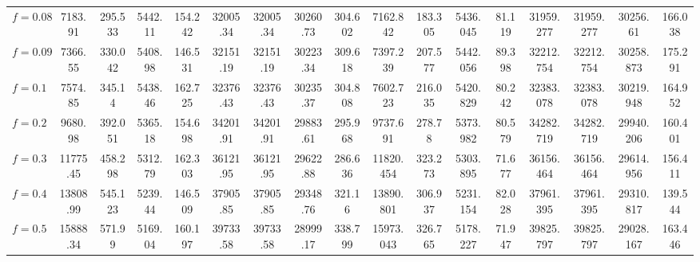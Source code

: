 \begin{tabular}{@{}lcccccccccccccccc@{}}
$f = 0.08$ & 7183.91 & 295.533 & 5442.11 & 154.242 & 32005.34 & 32005.34 & 30260.73 & 304.602 & 7162.842 & 183.305 & 5436.045 & 81.119 & 31959.277 & 31959.277 & 30256.61 & 166.038 \\
$f = 0.09$ & 7366.55 & 330.042 & 5408.98 & 146.531 & 32151.19 & 32151.19 & 30223.34 & 309.618 & 7397.239 & 207.577 & 5442.056 & 89.398 & 32212.754 & 32212.754 & 30258.873 & 175.291 \\
$f = 0.1$ & 7574.85 & 345.14 & 5438.46 & 162.725 & 32376.43 & 32376.43 & 30235.37 & 304.808 & 7602.723 & 216.035 & 5420.829 & 80.242 & 32383.078 & 32383.078 & 30219.948 & 164.952 \\
$f = 0.2$ & 9680.98 & 392.051 & 5365.18 & 154.698 & 34201.91 & 34201.91 & 29883.61 & 295.968 & 9737.691 & 278.78 & 5373.982 & 80.579 & 34282.719 & 34282.719 & 29940.206 & 160.401 \\
$f = 0.3$ & 11775.45 & 458.298 & 5312.79 & 162.303 & 36121.95 & 36121.95 & 29622.88 & 286.636 & 11820.454 & 323.273 & 5303.895 & 71.677 & 36156.464 & 36156.464 & 29614.956 & 156.411 \\
$f = 0.4$ & 13808.99 & 545.123 & 5239.44 & 146.509 & 37905.85 & 37905.85 & 29348.76 & 321.16 & 13890.801 & 306.937 & 5231.154 & 82.028 & 37961.395 & 37961.395 & 29310.817 & 139.544 \\
$f = 0.5$ & 15888.34 & 571.99 & 5169.04 & 160.197 & 39733.58 & 39733.58 & 28999.17 & 338.799 & 15973.043 & 326.765 & 5178.227 & 71.947 & 39825.797 & 39825.797 & 29028.167 & 163.446 \\
\bottomrule
\end{tabular}
